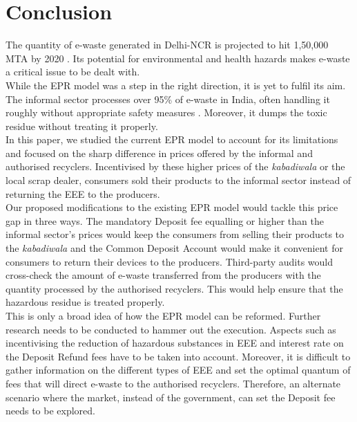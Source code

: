 \documentclass[a4paper, 12pt]{article}
\begin{document}
\section*{Conclusion}
                    The quantity of e-waste generated in Delhi-NCR is projected to hit 1,50,000 MTA by 2020 \parencite{assochamdelhi}. Its potential for environmental and health hazards makes e-waste a critical issue to be dealt with.\\
                     
                     While the EPR model was a step in the right direction, it is yet to fulfil its aim. The informal sector processes over 95\% of e-waste in India, often handling it roughly without appropriate safety measures \parencite{assochamstats}. Moreover, it dumps the toxic residue without treating it properly.\\ 
                    
                    In this paper, we studied the current EPR model to account for its limitations and focused on the sharp difference in prices offered by the informal and authorised recyclers. Incentivised by these higher prices of the \textit{kabadiwala} or the local scrap dealer, consumers sold their products to the informal sector instead of returning the EEE to the producers.\\
                    
                    Our proposed modifications to the existing EPR model would tackle this price gap in three ways. The mandatory Deposit fee equalling or higher than the informal sector’s prices would keep the consumers from selling their products to the \textit{kabadiwala} and the Common Deposit Account would make it convenient for consumers to return their devices to the producers. Third-party audits would cross-check the amount of e-waste transferred from the producers with the quantity processed by the authorised recyclers. This would help ensure that the hazardous residue is treated properly.\\
                    
                    This is only a broad idea of how the EPR model can be reformed. Further research needs to be conducted to hammer out the execution. Aspects such as incentivising the reduction of hazardous substances in EEE and interest rate on the Deposit Refund fees have to be taken into account. Moreover, it is difficult to gather information on the different types of EEE and set the optimal quantum of fees that will direct e-waste to the authorised recyclers. Therefore, an alternate scenario where the market, instead of the government, can set the Deposit fee needs to be explored.
\end{document}
